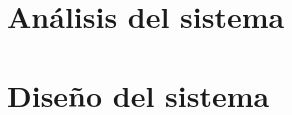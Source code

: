 \documentclass[12pt, oneside]{report}
\begin{document}
\chapter{Análisis del sistema}
\label{cap:analisis_sistema}


\chapter{Diseño del sistema}
\label{cap:diseno_sistema}



% 

% 


% 
\end{document}
